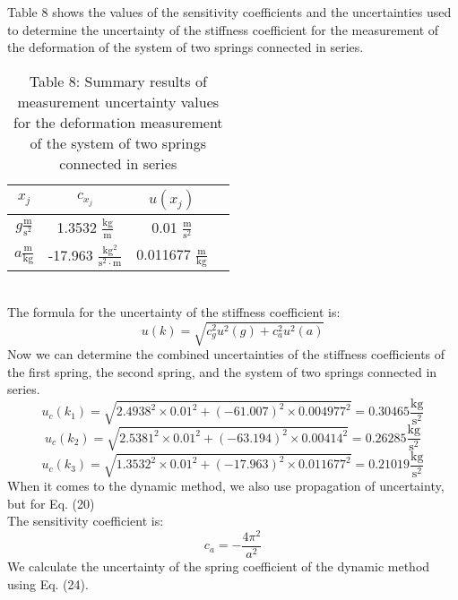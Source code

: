 \documentclass{article}
\begin{document}
Table 8 shows the values of the sensitivity coefficients and the uncertainties used to determine the uncertainty of the stiffness coefficient for the measurement of the deformation of the system of two springs connected in series.
\begin{table}[h!]
\centering
\caption{Table 8: Summary results of measurement uncertainty values for the deformation measurement of the system of two springs connected in series}
\begin{tabular}{|c|c|c|c|}
\hline
\textbf{\(x_j\)} & \textbf{\(c_{x_j}\)} & \textbf{\(u(x_j)\)} \\ \hline
\(g \mathrm{\frac{m}{s^2}}\) & 1.3532 \(\mathrm{\frac{kg}{m}}\) & 0.01 \(\mathrm{\frac{m}{s^2}}\) \\ \hline
\(a \mathrm{\frac{m}{kg}}\) & -17.963 \(\mathrm{\frac{kg^2}{s^2 \cdot m}}\) & 0.011677 \(\mathrm{\frac{m}{kg}}\) \\ \hline
\end{tabular}
\end{table}\\
The formula for the uncertainty of the stiffness coefficient is:
\begin{equation}
    u(k) = \sqrt{c_g^2u^2(g) + c_a^2u^2(a)}
\end{equation}
Now we can determine the combined uncertainties of the stiffness coefficients of the first spring, the second spring, and the system of two springs connected in series. \\
\begin{equation}
    u_c(k_1) = \sqrt{2.4938^2 \times 0.01^2 + (-61.007)^2 \times 0.004977^2} = 0.30465 \mathrm{\frac{kg}{s^2}}
\end{equation}
\begin{equation}
    u_c(k_2) = \sqrt{2.5381^2 \times 0.01^2 + (-63.194)^2 \times 0.00414^2} = 0.26285 \mathrm{\frac{kg}{s^2}}
\end{equation}
\begin{equation}
    u_c(k_3) = \sqrt{1.3532^2 \times 0.01^2 + (-17.963)^2 \times 0.011677^2} = 0.21019 \mathrm{\frac{kg}{s^2}}
\end{equation}
When it comes to the dynamic method, we also use propagation of uncertainty, but for Eq. (20) \\
The sensitivity coefficient is:
\begin{equation}
    c_a = -\frac{4 \pi ^2 }{a^2}
\end{equation}
We calculate the uncertainty of the spring coefficient of the dynamic method using Eq. (24).
\end{document}
